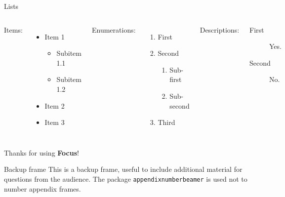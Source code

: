 \documentclass{beamer}
\begin{document}
    \begin{frame}{Lists}
        \begin{columns}[t, onlytextwidth]
                Items:
                \begin{itemize}
                    \item Item 1
                    \begin{itemize}
                        \item Subitem 1.1
                        \item Subitem 1.2
                    \end{itemize}
                    \item Item 2
                    \item Item 3
                \end{itemize}
            
                Enumerations:
                \begin{enumerate}
                    \item First
                    \item Second
                    \begin{enumerate}
                        \item Sub-first
                        \item Sub-second
                    \end{enumerate}
                    \item Third
                \end{enumerate}
            
                Descriptions:
                \begin{description}
                    \item[First] Yes.
                    \item[Second] No.
                \end{description}
        \end{columns}
    \end{frame}

    \begin{frame}[focus]
        Thanks for using \textbf{Focus}!
    \end{frame}
    
%        
%        
    
    \begin{frame}{Backup frame}
        This is a backup frame, useful to include additional material for questions from the audience.
        \vfill
        The package \texttt{appendixnumberbeamer} is used not to number appendix frames.
    \end{frame}
\end{document}
